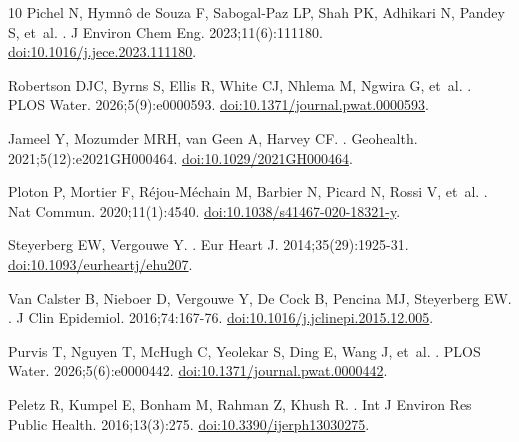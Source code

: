 \documentclass[10pt,letterpaper]{article}
\begin{document}
\begin{thebibliography}{10}
{Pichel} N, {Hymn{\^o} de Souza} F, {Sabogal-Paz} LP, {Shah} PK, {Adhikari} N,
  {Pandey} S, et~al.
.
\newblock J Environ Chem Eng. 2023;11(6):111180.
\newblock \href {http://dx.doi.org/10.1016/j.jece.2023.111180}
  {doi:10.1016/j.jece.2023.111180}.

{Robertson} DJC, {Byrns} S, {Ellis} R, {White} CJ, {Nhlema} M, {Ngwira} G,
  et~al.
.
\newblock PLOS Water. 2026;5(9):e0000593.
\newblock \href {http://dx.doi.org/10.1371/journal.pwat.0000593}
  {doi:10.1371/journal.pwat.0000593}.

{Jameel} Y, {Mozumder} MRH, {van Geen} A, {Harvey} CF.
.
\newblock Geohealth. 2021;5(12):e2021GH000464.
\newblock \href {http://dx.doi.org/10.1029/2021GH000464}
  {doi:10.1029/2021GH000464}.

{Ploton} P, {Mortier} F, {R{\'e}jou-M{\'e}chain} M, {Barbier} N, {Picard} N,
  {Rossi} V, et~al.
.
\newblock Nat Commun. 2020;11(1):4540.
\newblock \href {http://dx.doi.org/10.1038/s41467-020-18321-y}
  {doi:10.1038/s41467-020-18321-y}.

{Steyerberg} EW, {Vergouwe} Y.
.
\newblock Eur Heart J. 2014;35(29):1925-31.
\newblock \href {http://dx.doi.org/10.1093/eurheartj/ehu207}
  {doi:10.1093/eurheartj/ehu207}.

{Van Calster} B, {Nieboer} D, {Vergouwe} Y, {De Cock} B, {Pencina} MJ,
  {Steyerberg} EW.
.
\newblock J Clin Epidemiol. 2016;74:167-76.
\newblock \href {http://dx.doi.org/10.1016/j.jclinepi.2015.12.005}
  {doi:10.1016/j.jclinepi.2015.12.005}.

{Purvis} T, {Nguyen} T, {McHugh} C, {Yeolekar} S, {Ding} E, {Wang} J, et~al.
.
\newblock PLOS Water. 2026;5(6):e0000442.
\newblock \href {http://dx.doi.org/10.1371/journal.pwat.0000442}
  {doi:10.1371/journal.pwat.0000442}.

{Peletz} R, {Kumpel} E, {Bonham} M, {Rahman} Z, {Khush} R.
.
\newblock Int J Environ Res Public Health. 2016;13(3):275.
\newblock \href {http://dx.doi.org/10.3390/ijerph13030275}
  {doi:10.3390/ijerph13030275}.

\end{thebibliography}
\end{document}
